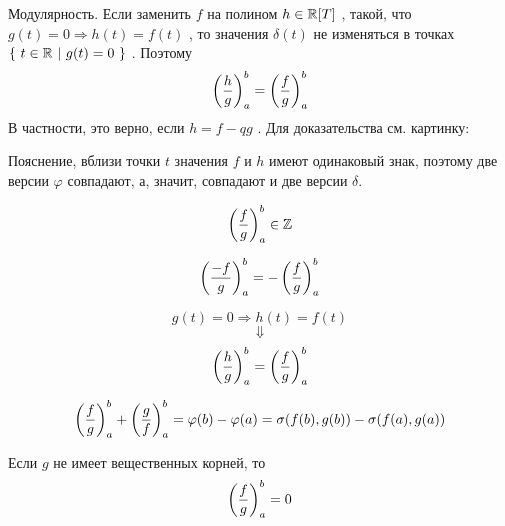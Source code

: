 \SSsect[!] Модулярность. Если заменить \( f \) на полином \( h \in \mathbb{R}[T] \) , такой, что
\( g(t) = 0 \Rightarrow h(t) = f(t) \) , то значения \( \delta(t) \) не изменяться в точках
\( \left\lbrace~  t\in \mathbb{R}  ~|~  g(t) = 0  ~\right\rbrace \) . Поэтому
\[ \left( \frac{h}{g} \right)^b_a = \left( \frac{f}{g} \right)^b_a \]
В частности, это верно, если \( h=f-qg \) . Для доказательства см. картинку:
\vspace
{}

Пояснение, вблизи точки \( t \) значения \( f\) и \( h \) имеют одинаковый знак, поэтому две версии \( \varphi \) совпадают, а, значит, совпадают и две версии \( \delta \).

\vspace

\SSresume

\SSsect 
\[ \left( \frac{f}{g} \right)^b_a \in \mathbb{Z} \]

\SSsect
\[ \left( \frac{-f}{g} \right)^b_a = - \left( \frac{f}{g} \right)^b_a \]

\SSsect
\[ g(t) = 0 \Rightarrow h(t) = f(t) \]
\[ \Downarrow \]
\[ \left( \frac{h}{g} \right)^b_a = \left( \frac{f}{g} \right)^b_a \]

\SSsect
\[ \left( \frac{f}{g} \right)^b_a + \left( \frac{g}{f} \right)^b_a = \varphi(b)-\varphi(a) = \sigma(f(b),g(b)) - \sigma(f(a),g(a)) \]

\SSsect Если \( g \) не имеет вещественных корней, то
\[ \left( \frac{f}{g} \right)^b_a = 0 \]

\SSbullet

\SSbullet




